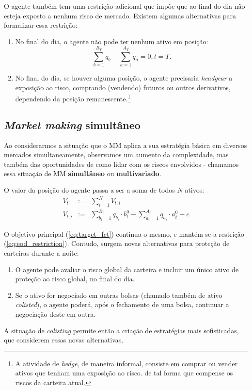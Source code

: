O agente também tem uma restrição adicional que impõe que ao final do dia não esteja exposto a nenhum risco de mercado. 
Existem algumas alternativas para formalizar essa restrição:
\begin{enumerate}
    \item No final do dia, o agente não pode ter nenhum ativo em posição: 
    \begin{equation}
        \sum_{b=1}^{B_T} q_b  - \sum_{a=1}^{A_T} q_a = 0, t=T. \label{eq:eod_restriction}
    \end{equation}
    \item No final do dia, se houver alguma posição, o agente precisaria \textit{headgear} a exposição ao risco, comprando (vendendo) futuros ou outros derivativos, dependendo da posição remanescente.\footnote{A atividade de \textit{hedge}, de maneira informal, consiste em comprar ou vender ativos que tenham uma exposição ao risco. de tal forma que compense os riscos da carteira atual.}
\end{enumerate}

\subsection{\textit{Market making} simultâneo}
 Ao considerarmos a situação que o MM aplica a sua estratégia básica em diversos mercados simultaneamente, observamos um aumento da complexidade, mas também das oportunidades de como lidar com os riscos envolvidos - chamamos essa situação de MM \textbf{simultâneo} ou \textbf{multivariado}.

 O valor da posição do agente passa a ser a soma de todos $N$ ativos:
 \begin{eqnarray*}
     V_t &:=& \sum_{i=1}^N V_{t,i}\\
     V_{t,i} &:=& \sum_{b_{i}=1}^{B_{i}} q_{b_{i}} \cdot b_{t}^{0} - \sum_{a_{i}=1}^{A_{i}} q_{a_{i}} \cdot a_{t}^{0} - c
 \end{eqnarray*}

O objetivo principal (\ref{eq:target_fct}) continua o mesmo, e mantém-se a restrição (\ref{eq:eod_restriction}). Contudo, surgem novas alternativas para proteção de carteiras durante a noite:

\begin{enumerate}
    \item O agente pode avaliar o risco global da carteira e incluir um único ativo de proteção ao risco global, no final do dia.
    \item Se o ativo for negociado em outras bolsas (chamado também de ativo \textit{colisted}), o agente poderá, após o fechamento de uma bolsa, continuar a negociação deste em outra.
\end{enumerate}

A situação de \textit{colisting} permite então a criação de estratégias mais sofisticadas, que considerem essas novas alternativas.
 